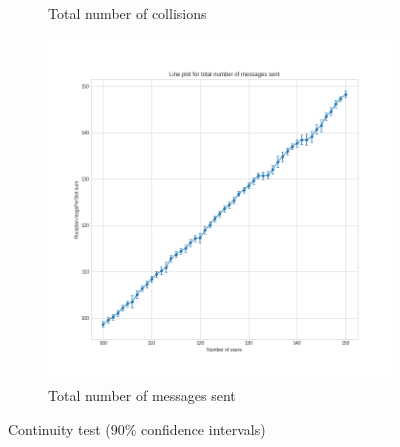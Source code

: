 \begin{figure}[p]
\begin{subfigure}[b]{0.45\textwidth}
		\caption{Total number of collisions}
	\end{subfigure}
	\begin{subfigure}[b]{0.35\textheight}
		\centering
		\includegraphics[width=\textwidth]{img/continuity-msgssent}
		\caption{Total number of messages sent}
	\end{subfigure}
	\caption{Continuity test (\(90\%\) confidence
	intervals)}\label{fig:continuity}
\end{figure}
\clearpage
{}
